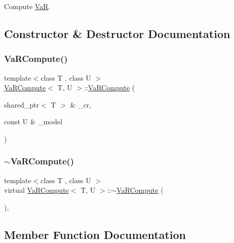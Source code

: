 Compute \hyperlink{classVaR}{VaR}. 

\subsection{Constructor \& Destructor Documentation}
\hypertarget{classVaRCompute_ac4fd50c6cb5cdc8ecd9964f1c317853a}{}\label{classVaRCompute_ac4fd50c6cb5cdc8ecd9964f1c317853a} 
\subsubsection{\texorpdfstring{Va\+R\+Compute()}{VaRCompute()}}
{\footnotesize\ttfamily template$<$class T , class U $>$ \\
\hyperlink{classVaRCompute}{Va\+R\+Compute}$<$ T, U $>$\+::\hyperlink{classVaRCompute}{Va\+R\+Compute} (\begin{DoxyParamCaption}\item[{shared\+\_\+ptr$<$ T $>$ \&}]{\+\_\+cr,  }\item[{const U \&}]{\+\_\+model }\end{DoxyParamCaption})\hspace{0.3cm}{\ttfamily [inline]}}

\hypertarget{classVaRCompute_a18b310b3562cadd560a70e2614a0e09c}{}\label{classVaRCompute_a18b310b3562cadd560a70e2614a0e09c} 
\subsubsection{\texorpdfstring{$\sim$\+Va\+R\+Compute()}{~VaRCompute()}}
{\footnotesize\ttfamily template$<$class T , class U $>$ \\
virtual \hyperlink{classVaRCompute}{Va\+R\+Compute}$<$ T, U $>$\+::$\sim$\hyperlink{classVaRCompute}{Va\+R\+Compute} (\begin{DoxyParamCaption}{ }\end{DoxyParamCaption})\hspace{0.3cm}{\ttfamily [inline]}, {\ttfamily [virtual]}}



\subsection{Member Function Documentation}
\hypertarget{classVaRCompute_a0465221010d248238fe1052958776984}{}\label{classVaRCompute_a0465221010d248238fe1052958776984} 
